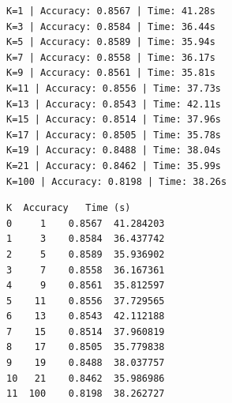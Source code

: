 \documentclass[11pt]{article}
\begin{document}
    \begin{Verbatim}[commandchars=\\\{\}]
K=1 | Accuracy: 0.8567 | Time: 41.28s
K=3 | Accuracy: 0.8584 | Time: 36.44s
K=5 | Accuracy: 0.8589 | Time: 35.94s
K=7 | Accuracy: 0.8558 | Time: 36.17s
K=9 | Accuracy: 0.8561 | Time: 35.81s
K=11 | Accuracy: 0.8556 | Time: 37.73s
K=13 | Accuracy: 0.8543 | Time: 42.11s
K=15 | Accuracy: 0.8514 | Time: 37.96s
K=17 | Accuracy: 0.8505 | Time: 35.78s
K=19 | Accuracy: 0.8488 | Time: 38.04s
K=21 | Accuracy: 0.8462 | Time: 35.99s
K=100 | Accuracy: 0.8198 | Time: 38.26s
    \end{Verbatim}

    
    \begin{Verbatim}[commandchars=\\\{\}]
      K  Accuracy   Time (s)
0     1    0.8567  41.284203
1     3    0.8584  36.437742
2     5    0.8589  35.936902
3     7    0.8558  36.167361
4     9    0.8561  35.812597
5    11    0.8556  37.729565
6    13    0.8543  42.112188
7    15    0.8514  37.960819
8    17    0.8505  35.779838
9    19    0.8488  38.037757
10   21    0.8462  35.986986
11  100    0.8198  38.262727
    \end{Verbatim}
\end{document}
